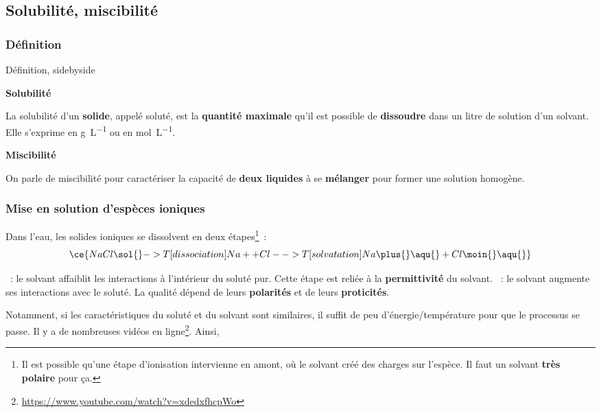 \documentclass[../main/main.tex]{subfiles}
\begin{document}
\subsection{Solubilité, miscibilité}
\subsubsection{Définition}
\begin{tdefi}{Définition, sidebyside}
    \begin{center}
        \textbf{Solubilité}
    \end{center}
    La solubilité d'un \textbf{solide}, appelé soluté, est la \textbf{quantité
    maximale} qu'il est possible de \textbf{dissoudre} dans un litre de solution
    d'un solvant. Elle s'exprime en \si{g.L^{-1}} ou en \si{mol.L^{-1}}.
    \tcblower
    \begin{center}
        \textbf{Miscibilité}
    \end{center}
    On parle de miscibilité pour caractériser la capacité de \textbf{deux
    liquides} à se \textbf{mélanger} pour former une solution homogène.
\end{tdefi}

\subsubsection{Mise en solution d'espèces ioniques}
Dans l'eau, les solides ioniques se dissolvent en deux étapes\footnote{Il est
    possible qu'une étape d'ionisation intervienne en amont, où le solvant créé
des charges sur l'espèce. Il faut un solvant \textbf{très polaire} pour ça.}~:
\[
    \ce{
        NaCl\sol{}
        ->T[dissociation]
        Na+ + Cl-
        ->T[solvatation]
        Na\plus{}\aqu{} + Cl\moin{}\aqu{}
}\]
\begin{itemize}
    ~: le solvant affaiblit les interactions à l'intérieur du
        soluté pur. Cette étape est reliée à la \textbf{permittivité} du
        solvant.
    ~: le solvant augmente ses interactions avec le soluté. La
        qualité dépend de leurs \textbf{polarités} et de leurs
        \textbf{proticités}.
\end{itemize} \smallbreak
Notamment, si les caractéristiques du soluté et du solvant sont similaires, il
suffit de peu d'énergie/température pour que le processus se passe. Il y a de
nombreuses vidéos en
ligne\footnote{\url{https://www.youtube.com/watch?v=xdedxfhcpWo}}. Ainsi,
\end{document}
